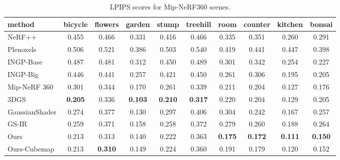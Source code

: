 \documentclass{article} %
\begin{document}
\begin{table}[ht]
    \small
    \centering
    \renewcommand{\arraystretch}{1}
    \caption{LPIPS scores for Mip-NeRF360 scenes.}
    \label{tab:mip3}
    \begin{tabular}{l|ccccc|cccc}
         \hline 
         method & bicycle & flowers & garden & stump & treehill & room & counter & kitchen & bonsai\\
        \hline NeRF++ &0.455 &  0.466 & 0.331  &  0.416 &0.466 &  0.335 &0.351 &0.260 & 0.291 \\
         Plenoxels & 0.506 & 0.521 &   0.386 & 0.503 &0.540  & 0.419 &0.441 &0.447 & 0.398 \\
         INGP-Base &0.487 & 0.481 &  0.312 &  0.450 &   0.489 & 0.301 & 0.342 & 0.254 & 0.227 \\
         INGP-Big & 0.446 & 0.441 &  0.257 & 0.421 & 0.450& 0.261 &0.306& 0.195 &0.205\\
         Mip-NeRF 360 & 0.301 & 0.344 &  0.170 & 0.261 & 0.339 & \cellcolor{c} 0.211 &\cellcolor{c}0.204 &\cellcolor{c}0.127 &\cellcolor{c}0.176 \\
         3DGS &\cellcolor{a}\textbf{0.205} &  \cellcolor{c}0.336 &  \cellcolor{a}\textbf{0.103} &\cellcolor{a} \textbf{0.210} &  \cellcolor{a} \textbf{0.317} & 0.220 &\cellcolor{c}0.204 &0.129 & 0.205\\
        \hline GaussianShader & 0.274 & 0.377 & \cellcolor{b} 0.130 &  0.297& 0.406 & 0.304 & 0.242 & 0.167 & 0.257\\
         GS-IR & \cellcolor{c}0.259 & 0.371 & 0.158 & 0.258 & 0.372 & 0.279 & 0.260 &  0.188 &  0.264\\
         \hline
         Ours  & \cellcolor{b}0.213 &\cellcolor{b}0.313 &\cellcolor{c} 0.140 & \cellcolor{b}0.222 &  \cellcolor{c}0.363 & \cellcolor{a}\textbf{0.175} & \cellcolor{a}\textbf{0.172} &\cellcolor{a} \textbf{0.111} & \cellcolor{a}\textbf{0.150}\\
         Ours-Cubemap &\cellcolor{b}0.213 & \cellcolor{a}\textbf{0.310} & 0.149 &  \cellcolor{c}0.224 &  \cellcolor{b}0.360&  \cellcolor{b}0.191 & \cellcolor{b} 0.179 & \cellcolor{b}0.120 &\cellcolor{b}0.152\\
        \hline 
    \end{tabular}
\end{table}
\end{document}
